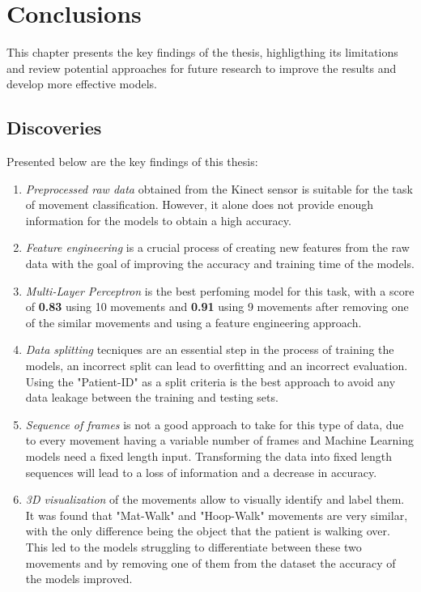 %
%
%
\chapter{Conclusions} \label{chap:conclusions}

    This chapter presents the key findings of the thesis, highligthing its limitations and review potential approaches for future research to improve the results and develop more effective models.

    \section{Discoveries}

        Presented below are the key findings of this thesis: 
        \begin{enumerate}
            \item \textit{Preprocessed raw data} obtained from the Kinect sensor is suitable for the task of movement classification. However, it alone does not provide enough information for the models to obtain a high accuracy.
            \item \textit{Feature engineering} is a crucial process of creating new features from the raw data with the goal of improving the accuracy and training time of the models.
            \item \textit{Multi-Layer Perceptron} is the best perfoming model for this task, with a score of \textbf{0.83} using 10 movements and \textbf{0.91} using 9 movements after removing one of the similar movements and using a feature engineering approach.
            \item \textit{Data splitting} tecniques are an essential step in the process of training the models, an incorrect split can lead to overfitting and an incorrect evaluation. Using the "Patient-ID" as a split criteria is the best approach to avoid any data leakage between the training and testing sets.
            \item \textit{Sequence of frames} is not a good approach to take for this type of data, due to every movement having a variable number of frames and Machine Learning models need a fixed length input. Transforming the data into fixed length sequences will lead to a loss of information and a decrease in accuracy.
            \item \textit{3D visualization} of the movements allow to visually identify and label them. It was found that "Mat-Walk" and "Hoop-Walk" movements are very similar, with the only difference being the object that the patient is walking over. This led to the models struggling to differentiate between these two movements and by removing one of them from the dataset the accuracy of the models improved.
        \end{enumerate}
    
